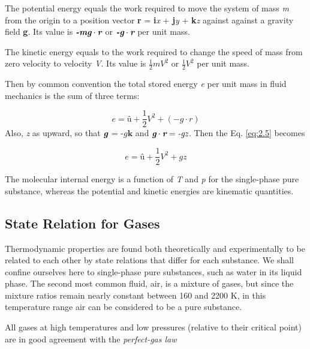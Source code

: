 \documentclass[12pt,twoside]{report}
\begin{document}
The potential energy equals the work required to move the system of mass \textit{m} from
the origin to a position vector \textbf{r} = \textbf{i}\textit{x} + \textbf{j}\textit{y} + \textbf{k}\textit{z} against against a gravity field \textbf{g}. Its value is $ \textit{\textbf{-mg}} \cdot \textit{\textbf{r}} $ or $ \textit{\textbf{-g}} \cdot \textit{\textbf{r}} $  per unit mass. \par

The kinetic energy equals to the work required to change the speed of mass from zero velocity to velocity \textit{V}. Its value is $ \frac{1}{2}mV^{2} $ or $ \frac{1}{2} V^{2} $ per unit mass. \par

Then by common convention the total stored energy \textit{e} per unit mass in fluid mechanics is the sum of three terms:

\begin{equation} \label{eq:2.5}
	e =\text{\^{u}} + \frac{1}{2}V^{2} + (-g\cdot r)
\end{equation}
Also, \textit{z} as upward, so that $\textit{\textbf{g}}$ = $\textit{-g} \textbf{k} $ and $ \textit{\textbf{g}} \cdot \textit{\textbf{r}} = \textit{-gz} $. Then the Eq. \eqref{eq:2.5} becomes 

\begin{equation} \label{eq:2.6}
	e = \text{\^{u}} + \frac{1}{2}V^{2} + gz
\end{equation}

The molecular internal energy  is a function of \textit{T} and \textit{p} for the single-phase pure substance, whereas the potential and kinetic energies are kinematic quantities. \cite{White}

\subsection{State Relation for Gases}
Thermodynamic properties are found both theoretically and experimentally to be
related to each other by state relations that differ for each substance. We shall confine ourselves here to single-phase pure substances, such as water in its liquid phase. The second most common fluid, air, is a mixture of gases, but since the mixture ratios remain nearly constant between 160 and 2200 K, in this temperature range air can be considered to be a pure substance.\par

All gases at high temperatures and low pressures (relative to their critical point)
are in good agreement with the \textit{perfect-gas law} \cite{White}
\end{document}
